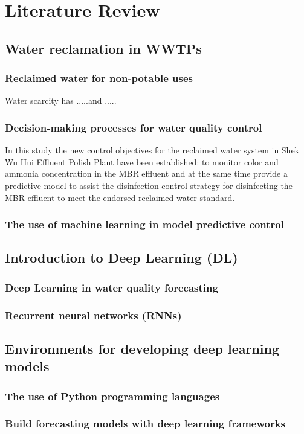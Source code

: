 \chapter{Literature Review}

\section{Water reclamation in WWTPs}
\subsection{Reclaimed water for non-potable uses}

Water scarcity has .....and .....

\subsection{Decision-making processes for water quality control}

In this study the new control objectives for the reclaimed water system in 
Shek Wu Hui Effluent Polish Plant have been established: to monitor color 
and ammonia concentration in the MBR effluent and at the same time provide 
a predictive model to assist the disinfection control strategy for disinfecting 
the MBR effluent to meet the endorsed reclaimed water standard.


\subsection{The use of machine learning in model predictive control}


\section{Introduction to Deep Learning (DL)}
\subsection{Deep Learning in water quality forecasting}
\subsection{Recurrent neural networks (RNNs)}

\section{Environments for developing deep learning models}
\subsection{The use of Python programming languages}
\subsection{Build forecasting models with deep learning frameworks}

